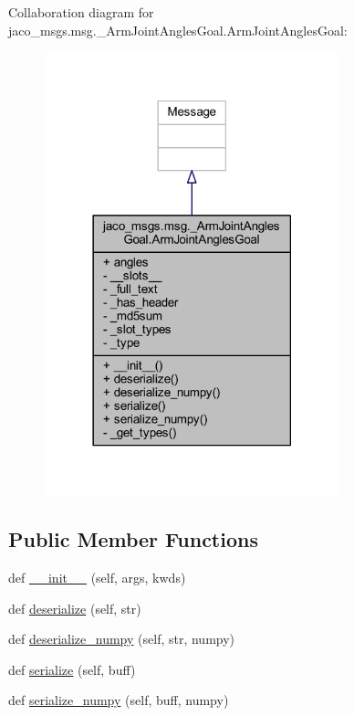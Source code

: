 Collaboration diagram for jaco\+\_\+msgs.\+msg.\+\_\+\+Arm\+Joint\+Angles\+Goal.\+Arm\+Joint\+Angles\+Goal\+:
\nopagebreak
\begin{figure}[H]
\begin{center}
\leavevmode
\includegraphics[width=242pt]{d2/d4c/classjaco__msgs_1_1msg_1_1__ArmJointAnglesGoal_1_1ArmJointAnglesGoal__coll__graph}
\end{center}
\end{figure}
\subsection*{Public Member Functions}
\begin{DoxyCompactItemize}
\item 
def \hyperlink{classjaco__msgs_1_1msg_1_1__ArmJointAnglesGoal_1_1ArmJointAnglesGoal_a2b03e9f8bd7fa46de03afdb1ab8d6cf3}{\+\_\+\+\_\+init\+\_\+\+\_\+} (self, args, kwds)
\item 
def \hyperlink{classjaco__msgs_1_1msg_1_1__ArmJointAnglesGoal_1_1ArmJointAnglesGoal_a98d117435010654e0dd37993d44364cc}{deserialize} (self, str)
\item 
def \hyperlink{classjaco__msgs_1_1msg_1_1__ArmJointAnglesGoal_1_1ArmJointAnglesGoal_a161596088421836e336280ee413a8792}{deserialize\+\_\+numpy} (self, str, numpy)
\item 
def \hyperlink{classjaco__msgs_1_1msg_1_1__ArmJointAnglesGoal_1_1ArmJointAnglesGoal_a6fe969acdeea9cd178d6810ac9031737}{serialize} (self, buff)
\item 
def \hyperlink{classjaco__msgs_1_1msg_1_1__ArmJointAnglesGoal_1_1ArmJointAnglesGoal_a3cdf8677763d16e6a1817c2f9cea75f3}{serialize\+\_\+numpy} (self, buff, numpy)
\end{DoxyCompactItemize}

